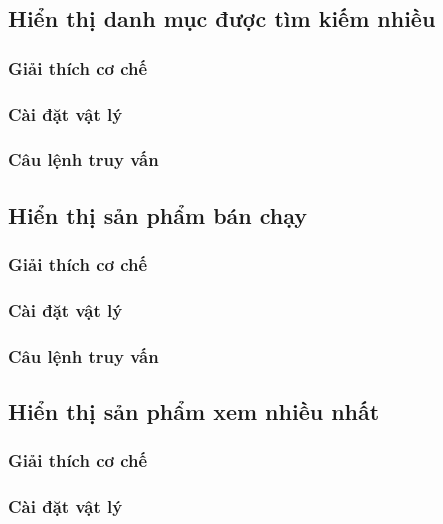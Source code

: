 \subsection{Hiển thị danh mục được tìm kiếm nhiều}

\subsubsection{Giải thích cơ chế}

\subsubsection{Cài đặt vật lý}

\subsubsection{Câu lệnh truy vấn}

\subsection{Hiển thị sản phẩm bán chạy}

\subsubsection{Giải thích cơ chế}

\subsubsection{Cài đặt vật lý}

\subsubsection{Câu lệnh truy vấn}

\subsection{Hiển thị sản phẩm xem nhiều nhất}

\subsubsection{Giải thích cơ chế}

\subsubsection{Cài đặt vật lý}

